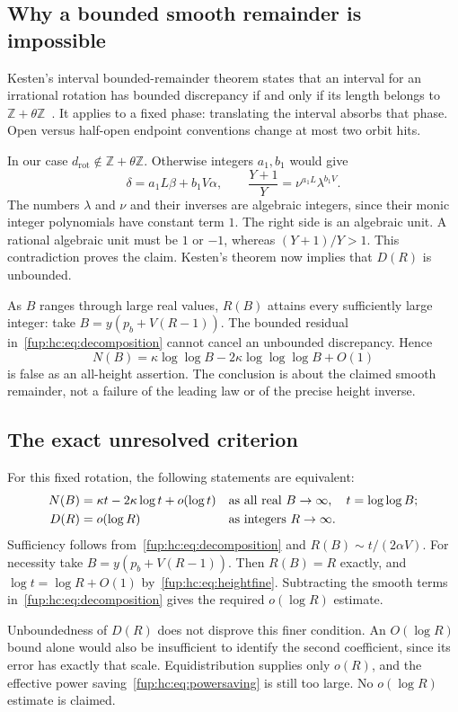 \documentclass[11pt,letterpaper]{article}
\theoremstyle{definition}\newtheorem{definition}[theorem]{Definition}
\theoremstyle{remark}\newtheorem{remark}[theorem]{Remark}
\newcommand{\Z}{\mathbb Z}\newcommand{\Np}{\mathbb Z_{>0}}
\newcommand{\drot}{d_{\mathrm{rot}}}
\begin{document}
\subsection{Why a bounded smooth remainder is impossible}
Kesten's interval bounded-remainder theorem states that an interval for an irrational rotation has bounded discrepancy if and only if its length belongs to $\Z+\theta\Z$~\cite{fup:hc:kesten,fup:hc:kelly}. It applies to a fixed phase: translating the interval absorbs that phase. Open versus half-open endpoint conventions change at most two orbit hits.

In our case $\drot\notin\Z+\theta\Z$. Otherwise integers $a_1,b_1$ would give
\[
 \delta=a_1L\beta+b_1V\alpha,\qquad
 \frac{Y+1}{Y}=\nu^{a_1L}\lambda^{b_1V}.
\]
The numbers $\lambda$ and $\nu$ and their inverses are algebraic integers, since their monic integer polynomials have constant term $1$. The right side is an algebraic unit. A rational algebraic unit must be $1$ or $-1$, whereas $(Y+1)/Y>1$. This contradiction proves the claim. Kesten's theorem now implies that $D(R)$ is unbounded.

As $B$ ranges through large real values, $R(B)$ attains every sufficiently large integer: take $B=y(p_b+V(R-1))$. The bounded residual in~\eqref{fup:hc:eq:decomposition} cannot cancel an unbounded discrepancy. Hence
\[
 N(B)=\kappa\log\log B-2\kappa\log\log\log B+O(1)
\]
is false as an all-height assertion. The conclusion is about the claimed smooth remainder, not a failure of the leading law or of the precise height inverse.

\subsection{The exact unresolved criterion}
For this fixed rotation, the following statements are equivalent:
\begin{align}\label{fup:hc:eq:equiv}
 N(B)&=\kappa t-2\kappa\log t+o(\log t)
       &&\text{as all real }B\to\infty,\quad t=\log\log B;\notag\\
 D(R)&=o(\log R)&&\text{as integers }R\to\infty.
\end{align}
Sufficiency follows from~\eqref{fup:hc:eq:decomposition} and $R(B)\sim t/(2\alpha V)$. For necessity take $B=y(p_b+V(R-1))$. Then $R(B)=R$ exactly, and $\log t=\log R+O(1)$ by~\eqref{fup:hc:eq:heightfine}. Subtracting the smooth terms in~\eqref{fup:hc:eq:decomposition} gives the required $o(\log R)$ estimate.

Unboundedness of $D(R)$ does not disprove this finer condition. An $O(\log R)$ bound alone would also be insufficient to identify the second coefficient, since its error has exactly that scale. Equidistribution supplies only $o(R)$, and the effective power saving~\eqref{fup:hc:eq:powersaving} is still too large. No $o(\log R)$ estimate is claimed.
\end{document}
